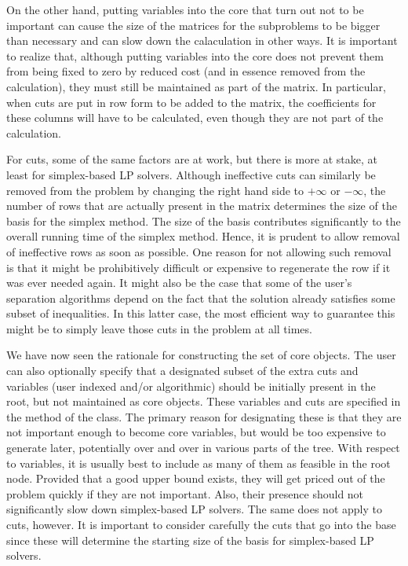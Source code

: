 On the other hand, putting variables into the core that turn out not
to be important can cause the size of the matrices for the subproblems
to be bigger than necessary and can slow down the calaculation in
other ways. It is important to realize that, although putting
variables into the core does not prevent them from being fixed to zero
by reduced cost (and in essence removed from the calculation), they
must still be maintained as part of the matrix. In particular, when
cuts are put in row form to be added to the matrix, the coefficients
for these columns will have to be calculated, even though they are not
part of the calculation.

For cuts, some of the same factors are at work, but there is more at
stake, at least for simplex-based LP solvers. Although ineffective
cuts can similarly be removed from the problem by changing the right
hand side to $+\infty$ or $-\infty$, the number of rows that are
actually present in the matrix determines the size of the basis for
the simplex method. The size of the basis contributes significantly to
the overall running time of the simplex method. Hence, it is prudent
to allow removal of ineffective rows as soon as possible. One reason
for not allowing such removal is that it might be prohibitively
difficult or expensive to regenerate the row if it was ever needed
again. It might also be the case that some of the user's separation
algorithms depend on the fact that the solution already satisfies some
subset of inequalities. In this latter case, the most efficient way to
guarantee this might be to simply leave those cuts in the problem at
all times.

We have now seen the rationale for constructing the set of core
objects. The user can also optionally specify that a
designated subset of the extra cuts and variables (user indexed and/or
algorithmic) should be
initially present in the root, but not maintained as core objects.
These  variables and cuts are specified 
in the  method of the 
class. The primary reason for designating these is that they are not
important enough to become core variables, but would be too expensive
to generate later, potentially over and over in various parts of the
tree. With respect to variables, it is usually best to include as many
of them as feasible in the root node. Provided that a good upper bound
exists, they will get priced out of the problem quickly if they are
not important. Also, their presence should not significantly slow down
simplex-based LP solvers. The same does not apply to cuts, however. It
is important to consider carefully the cuts that go into the base
since these will determine the starting size of the basis for
simplex-based LP solvers.

